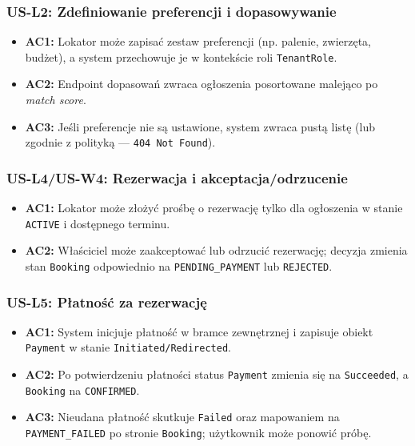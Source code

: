 \documentclass[11pt, a4paper]{article}
\begin{document}
\subsubsection{US-L2: Zdefiniowanie preferencji i dopasowywanie}
\begin{itemize}
    \item \textbf{AC1:} Lokator może zapisać zestaw preferencji (np. palenie, zwierzęta, budżet), a system przechowuje je w kontekście roli \texttt{TenantRole}.
    \item \textbf{AC2:} Endpoint dopasowań zwraca ogłoszenia posortowane malejąco po \textit{match score}.
    \item \textbf{AC3:} Jeśli preferencje nie są ustawione, system zwraca pustą listę (lub zgodnie z polityką --- \texttt{404 Not Found}).
\end{itemize}

\subsubsection{US-L4/US-W4: Rezerwacja i akceptacja/odrzucenie}
\begin{itemize}
    \item \textbf{AC1:} Lokator może złożyć prośbę o rezerwację tylko dla ogłoszenia w stanie \texttt{ACTIVE} i dostępnego terminu.
    \item \textbf{AC2:} Właściciel może zaakceptować lub odrzucić rezerwację; decyzja zmienia stan \texttt{Booking} odpowiednio na \texttt{PENDING\_PAYMENT} lub \texttt{REJECTED}.
\end{itemize}

\subsubsection{US-L5: Płatność za rezerwację}
\begin{itemize}
    \item \textbf{AC1:} System inicjuje płatność w bramce zewnętrznej i zapisuje obiekt \texttt{Payment} w stanie \texttt{Initiated/Redirected}.
    \item \textbf{AC2:} Po potwierdzeniu płatności status \texttt{Payment} zmienia się na \texttt{Succeeded}, a \texttt{Booking} na \texttt{CONFIRMED}.
    \item \textbf{AC3:} Nieudana płatność skutkuje \texttt{Failed} oraz mapowaniem na \texttt{PAYMENT\_FAILED} po stronie \texttt{Booking}; użytkownik może ponowić próbę.
\end{itemize}
\end{document}
